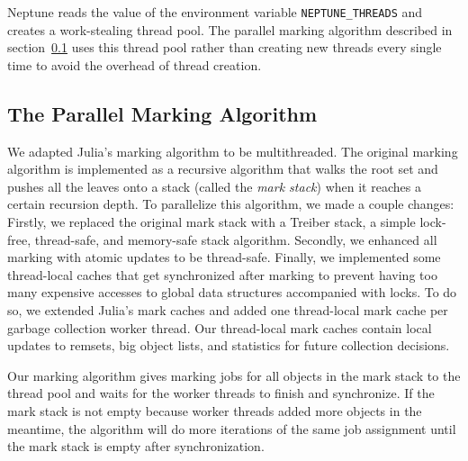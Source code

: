 Neptune reads the value of the environment variable \texttt{NEPTUNE\_THREADS} and creates a work-stealing thread pool.
The parallel marking algorithm described in section~\ref{marking_algo} uses this thread pool rather than creating new threads every single time to avoid the overhead of thread creation.

\subsection{The Parallel Marking Algorithm}
\label{marking_algo}
We adapted Julia's marking algorithm to be multithreaded.
The original marking algorithm is implemented as a recursive algorithm that walks the root set and pushes all the leaves onto a stack (called the \emph{mark stack}) when it reaches a certain recursion depth.
To parallelize this algorithm, we made a couple changes:
Firstly, we replaced the original mark stack with a Treiber stack, a simple lock-free, thread-safe, and memory-safe stack algorithm.
Secondly, we enhanced all marking with atomic updates to be thread-safe.
Finally, we implemented some thread-local caches that get synchronized after marking to prevent having too many expensive accesses to global data structures accompanied with locks.
To do so, we extended Julia's mark caches and added one thread-local mark cache per garbage collection worker thread.
Our thread-local mark caches contain local updates to remsets, big object lists, and statistics for future collection decisions.

Our marking algorithm gives marking jobs for all objects in the mark stack to the thread pool and waits for the worker threads to finish and synchronize.
If the mark stack is not empty because worker threads added more objects in the meantime, the algorithm will do more iterations of the same job assignment until the mark stack is empty after synchronization.

